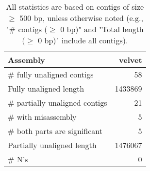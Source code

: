 \documentclass[12pt,a4paper]{article}
\begin{document}
\begin{table}[ht]
\begin{center}
\caption{All statistics are based on contigs of size $\geq$ 500 bp, unless otherwise noted (e.g., "\# contigs ($\geq$ 0 bp)" and "Total length ($\geq$ 0 bp)" include all contigs).}
\begin{tabular}{|l*{1}{|r}|}
\hline
Assembly & velvet \\ \hline
\# fully unaligned contigs & 58 \\ \hline
Fully unaligned length & 1433869 \\ \hline
\# partially unaligned contigs & 21 \\ \hline
\hspace{5mm}\# with misassembly & 5 \\ \hline
\hspace{5mm}\# both parts are significant & 5 \\ \hline
Partially unaligned length & 1476067 \\ \hline
\# N's & 0 \\ \hline
\end{tabular}
\end{center}
\end{table}
\end{document}
